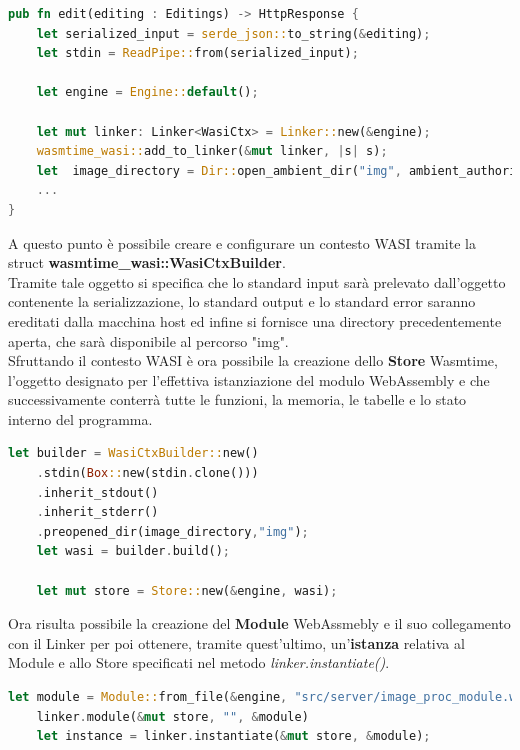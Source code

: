 \begin{lstlisting}[language=rust, caption={File handlers.rs: operazioni preliminari}, showstringspaces=false]
pub fn edit(editing : Editings) -> HttpResponse {
    let serialized_input = serde_json::to_string(&editing);
    let stdin = ReadPipe::from(serialized_input);
    
    let engine = Engine::default();
    
    let mut linker: Linker<WasiCtx> = Linker::new(&engine);
    wasmtime_wasi::add_to_linker(&mut linker, |s| s); 
    let  image_directory = Dir::open_ambient_dir("img", ambient_authority());
    ...
}
\end{lstlisting}
A questo punto è possibile creare e configurare un contesto WASI tramite la struct \textbf{wasmtime\_wasi::WasiCtxBuilder}.
\\Tramite tale oggetto si specifica che lo standard input sarà prelevato dall'oggetto contenente la serializzazione, lo standard output e lo standard error saranno ereditati dalla macchina host ed infine si fornisce una directory precedentemente aperta, che sarà disponibile al percorso "img".
\\Sfruttando il contesto WASI è ora possibile la creazione dello \textbf{Store} Wasmtime, l'oggetto designato per l'effettiva istanziazione del modulo WebAssembly e che successivamente conterrà tutte le funzioni, la memoria, le tabelle e lo stato interno del programma.
\begin{lstlisting}[language=rust,caption={File handlers.rs: creazione di contesto WASI e Store}, showstringspaces=false]
    let builder = WasiCtxBuilder::new()
    .stdin(Box::new(stdin.clone()))
    .inherit_stdout()
    .inherit_stderr()
    .preopened_dir(image_directory,"img");
    let wasi = builder.build();
    
    let mut store = Store::new(&engine, wasi);
\end{lstlisting}
Ora risulta possibile la creazione del \textbf{Module} WebAssmebly e il suo collegamento con il Linker per poi ottenere, tramite quest'ultimo, un'\textbf{istanza} relativa al Module e allo Store specificati nel metodo \emph{linker.instantiate()}.
\begin{lstlisting}[language=rust,caption={File handlers.rs: istanziazione modulo Wasm}, showstringspaces=false]
    let module = Module::from_file(&engine, "src/server/image_proc_module.wasm");
    linker.module(&mut store, "", &module) 
    let instance = linker.instantiate(&mut store, &module);
\end{lstlisting}
